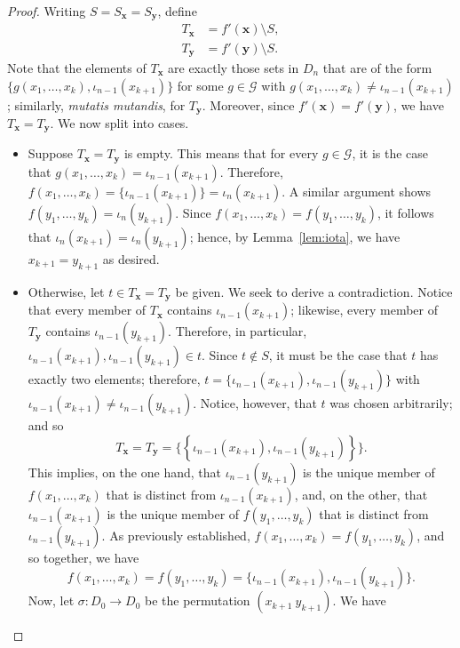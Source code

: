 \documentclass[10pt,a4paper]{amsart}
\begin{document}
\begin{proof}
    Writing $S = S_{\mathbf x} = S_{\mathbf y}$, define
    \begin{align*}
        T_{\mathbf x} &= f'(\mathbf x) \setminus S,\\
        T_{\mathbf y} &= f'(\mathbf y) \setminus S.
    \end{align*}
    Note that the elements of $T_{\mathbf x}$ are exactly those sets in $D_n$ that are of the form $\{g(x_1, \dots, x_k), \iota_{n-1}(x_{k+1})\}$ for some $g \in \mathcal G$ with $g(x_1, \dots, x_k) \neq \iota_{n-1}(x_{k+1})$; similarly, \emph{mutatis mutandis}, for $T_{\mathbf y}$. Moreover, since $f'(\mathbf x) = f'(\mathbf y)$, we have $T_{\mathbf x} = T_{\mathbf y}$. We now split into cases.
    \begin{itemize}
        \item Suppose $T_{\mathbf x} = T_{\mathbf y}$ is empty. This means that for every $g \in \mathcal G$, it is the case that $g(x_1, \dots, x_k) = \iota_{n-1}(x_{k+1})$. Therefore, $f(x_1, \dots, x_k) = \{\iota_{n-1}(x_{k+1})\} = \iota_n(x_{k+1})$. A similar argument shows $f(y_1, \dots, y_k) = \iota_n(y_{k+1})$. Since $f(x_1, \dots, x_k) = f(y_1, \dots, y_k)$, it follows that $\iota_n(x_{k+1}) = \iota_n(y_{k+1})$; hence, by Lemma~\ref{lem:iota}, we have $x_{k+1} = y_{k+1}$ as desired.
        \item Otherwise, let $t \in T_{\mathbf x} = T_{\mathbf y}$ be given. We seek to derive a contradiction. Notice that every member of $T_{\mathbf x}$ contains $\iota_{n-1}(x_{k+1})$; likewise, every member of $T_{\mathbf y}$ contains $\iota_{n-1}(y_{k+1})$. Therefore, in particular, $\iota_{n-1}(x_{k+1}), \iota_{n-1}(y_{k+1}) \in t$. Since $t \notin S$, it must be the case that $t$ has exactly two elements; therefore, $t = \{\iota_{n-1}(x_{k+1}), \iota_{n-1}(y_{k+1})\}$ with $\iota_{n-1}(x_{k+1}) \neq \iota_{n-1}(y_{k+1})$. Notice, however, that $t$ was chosen arbitrarily; and so
        \[T_{\mathbf x} = T_{\mathbf y} = \big\{\left\{\iota_{n-1}(x_{k+1}), \iota_{n-1}(y_{k+1})\right\}\big\}.\]
        This implies, on the one hand, that $\iota_{n-1}(y_{k+1})$ is the unique member of $f(x_1, \dots, x_k)$ that is distinct from $\iota_{n-1}(x_{k+1})$, and, on the other, that $\iota_{n-1}(x_{k+1})$ is the unique member of $f(y_1, \dots, y_k)$ that is distinct from $\iota_{n-1}(y_{k+1})$. As previously established, $f(x_1, \dots, x_k) = f(y_1, \dots, y_k)$, and so together, we have
        \[f(x_1, \dots, x_k) = f(y_1, \dots, y_k) = \{\iota_{n-1}(x_{k+1}), \iota_{n-1}(y_{k+1})\}.\]
        Now, let $\sigma : D_0 \to D_0$ be the permutation $(x_{k+1}\ y_{k+1})$. We have

\end{itemize}
\end{proof}
\end{document}

